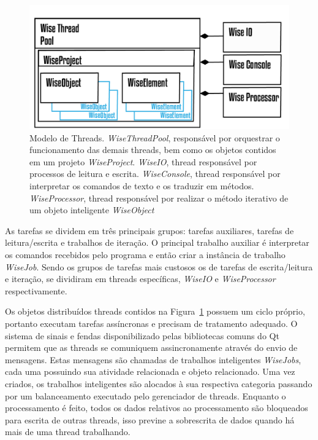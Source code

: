 \documentclass[a4paper,12pt]{monografia}
\theoremstyle{plain}
\theoremstyle{definition}
\theoremstyle{remark}
\begin{document}
\begin{figure}[!htbp]
	\centering
	\includegraphics[scale=1]{Figures/WiseThreadPool.png}
	\caption{Modelo de Threads. \textit{WiseThreadPool}, responsável por orquestrar o funcionamento das demais threads, bem como os objetos contidos em um projeto \textit{WiseProject}. \textit{WiseIO}, thread responsável por processos de leitura e escrita. \textit{WiseConsole}, thread responsável por interpretar os comandos de texto e os traduzir em métodos. \textit{WiseProcessor}, thread responsável por realizar o método iterativo de um objeto inteligente \textit{WiseObject}}
	\label{fig7:threads}
\end{figure}

As tarefas se dividem em três principais grupos: tarefas auxiliares, tarefas de leitura/escrita e trabalhos de iteração. O principal trabalho auxiliar é interpretar os comandos recebidos pelo programa e então criar a instância de trabalho \textit{WiseJob}. Sendo os grupos de tarefas mais custosos os de tarefas de escrita/leitura e iteração, se dividiram em threads específicas, \textit{WiseIO} e \textit{WiseProcessor} respectivamente.

Os objetos distribuídos threads contidos na Figura~\ref{fig7:threads} possuem um ciclo próprio, portanto executam tarefas assíncronas e precisam de tratamento adequado. O sistema de sinais e fendas disponibilizado pelas bibliotecas comuns do Qt permitem que as threads se comuniquem assincronamente através do envio de mensagens. Estas mensagens são chamadas de trabalhos inteligentes \textit{WiseJobs}, cada uma possuindo sua atividade relacionada e objeto relacionado. Uma vez criados, os trabalhos inteligentes são alocados à sua respectiva categoria passando por um balanceamento executado pelo gerenciador de threads. Enquanto o processamento é feito, todos os dados relativos ao processamento são bloqueados para escrita de outras threads, isso previne a sobrescrita de dados quando há mais de uma thread trabalhando.
\end{document}
